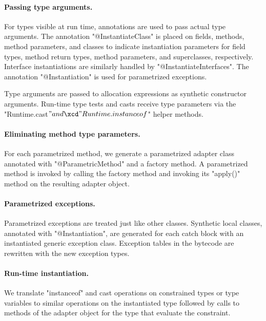 \paragraph{Passing type arguments.}

For types visible at run time, annotations are used to
pass actual type arguments.  The annotation \xcd"@InstantiateClass"
is placed on
fields, methods,
method parameters, and classes to
indicate instantiation parameters for field
types, method return types, method parameters, and superclasses,
respectively.
Interface instantiations are similarly handled
by \xcd"@InstantiateInterfaces".
The annotation
\xcd"@Instantiation"
is used for parametrized exceptions.

Type arguments are passed to allocation expressions as
synthetic constructor arguments.  Run-time type tests and casts
receive type parameters via the \xcd"Runtime.cast$" and
\xcd"Runtime.instanceof$" helper methods.

\paragraph{Eliminating method type parameters.}

For each parametrized method, we generate a parametrized
adapter class annotated with \xcd"@ParametricMethod" and a
factory method.
A parametrized method is invoked by calling the factory method
and invoking its
\xcd"apply()" method on the resulting adapter object.

\paragraph{Parametrized exceptions.}

Parametrized exceptions are treated just like other classes.
Synthetic local classes, annotated with \xcd"@Instantiation",
are generated for each catch block with an instantiated
generic exception class.  Exception tables in the
bytecode are rewritten with the new exception types.

\paragraph{Run-time instantiation.}

We translate \xcd"instanceof" and cast operations on
constrained types or type variables
to
similar operations on the instantiated type followed by calls
to
methods of the adapter object for the type
that evaluate the constraint.
